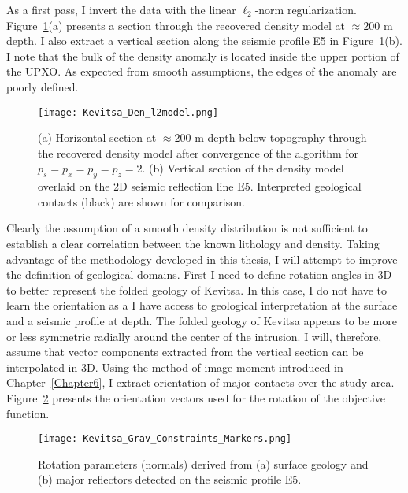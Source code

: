 As a first pass, I invert the data with the linear $\ell_2$-norm regularization.
Figure~\ref{Kevitsa_Den_l2model}(a) presents a section through the recovered density model at $\approx 200$ m depth. I also extract a vertical section along the seismic profile E5 in Figure~\ref{Kevitsa_Den_l2model}(b). I note that the bulk of the density anomaly is located inside the upper portion of the UPXO. As expected from smooth assumptions, the edges of the anomaly are poorly defined.
\begin{figure}
\texttt{[image: Kevitsa\_Den\_l2model.png]}
\caption{(a) Horizontal section at $\approx 200$ m depth below topography through the recovered density model after convergence of the algorithm for $p_s=p_x=p_y=p_z=2$. (b) Vertical section of the density model overlaid on the 2D seismic reflection line E5. Interpreted geological contacts (black) are shown for comparison.}
\label{Kevitsa_Den_l2model}
\end{figure}

Clearly the assumption of a smooth density distribution is not sufficient to establish a clear correlation between the known lithology and density.
Taking advantage of the methodology developed in this thesis, I will attempt to improve the definition of geological domains. First I need to define rotation angles in 3D to better represent the folded geology of Kevitsa. In this case, I do not have to learn the orientation as a I have access to geological interpretation at the surface and a seismic profile at depth. 
The folded geology of Kevitsa appears to be more or less symmetric radially around the center of the intrusion. I will, therefore, assume that vector components extracted from the vertical section can be interpolated in 3D.
Using the method of image moment introduced in Chapter~\ref{Chapter6}, I extract orientation of major contacts over the study area. Figure~\ref{Kevitsa_Fold_ROT_l2Model} presents the orientation vectors used for the rotation of the objective function.
\begin{figure}[h!]
\centering
\texttt{[image: Kevitsa\_Grav\_Constraints\_Markers.png]}
\caption{Rotation parameters (normals) derived from (a) surface geology and (b) major reflectors detected on the seismic profile E5.}
\label{Kevitsa_Fold_ROT_l2Model}
\end{figure}

